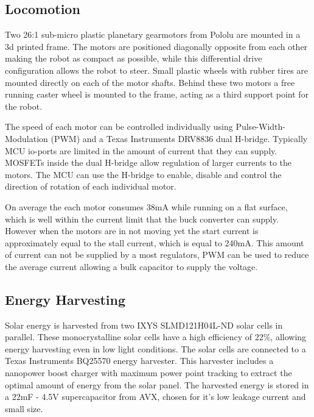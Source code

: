 \subsection{Locomotion}


Two 26:1 sub-micro plastic planetary gearmotors from Pololu are mounted in a 3d printed frame.
The motors are positioned diagonally opposite from each other making the robot as compact as possible, while this differential drive configuration allows the robot to steer.
Small plastic wheels with rubber tires are mounted directly on each of the motor shafts.
Behind these two motors a free running caster wheel is mounted to the frame, acting as a third support point for the robot.

The speed of each motor can be controlled individually using Pulse-Width-Modulation (PWM) and a Texas Instruments DRV8836 dual H-bridge.
Typically MCU io-ports are limited in the amount of current that they can supply.
MOSFETs inside the dual H-bridge allow regulation of larger currents to the motors.
The MCU can use the H-bridge to enable, disable and control the direction of rotation of each individual motor.


On average the each motor consumes 38mA while running on a flat surface, which is well within the current limit that the buck converter can supply.
However when the motors are in not moving yet the start current is approximately equal to the stall current, which is equal to 240mA.
This amount of current can not be supplied by a most regulators, PWM can be used to reduce the average current allowing a bulk capacitor to supply the voltage.

\subsection{Energy Harvesting}
\label{sec:energy_harvesting}

Solar energy is harvested from two IXYS SLMD121H04L-ND solar cells in parallel.
These monocrystalline solar cells have a high efficiency of 22\%, allowing energy harvesting even in low light conditions.
The solar cells are connected to a Texas Instruments BQ25570 energy harvester. 
This harvester includes a nanopower boost charger with maximum power point tracking to extract the optimal amount of energy from the solar panel. 
The harvested energy is stored in a 22mF - 4.5V supercapacitor from AVX, chosen for it's low leakage current and small size.

